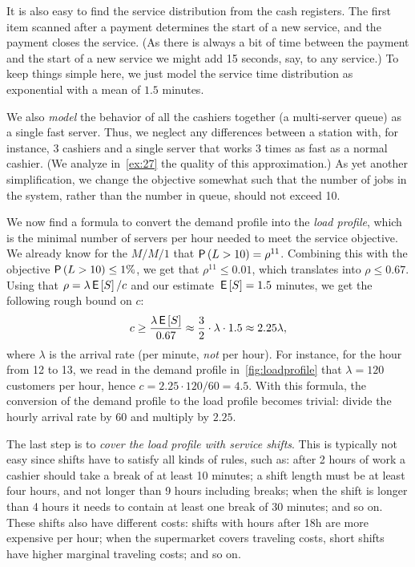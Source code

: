 It is also easy to find the service distribution from the cash registers.
The first item scanned after a payment determines the start of a new service, and the payment closes the service.
(As there is always a bit of time between the payment and the start of a new service we might add 15 seconds, say, to any service.)
To keep things simple here, we just model the service time distribution as exponential with a mean of $1.5$ minutes.

We also \emph{model} the behavior of all the cashiers together (a multi-server queue) as a single fast server.
Thus, we neglect any differences between a station with, for instance, 3 cashiers and a single server that works 3 times as fast as a normal cashier.
(We analyze in~\cref{ex:27} the quality of this approximation.)
As yet another simplification, we change the objective somewhat such that the number of jobs in the system, rather than the number in queue, should not exceed 10.

We now find a formula to convert the demand profile into the \emph{load profile}, which is the minimal number of servers per hour needed to meet the service objective. We already know for the $M/M/1$ that $\P{L>10}=\rho^{11}$.  Combining this with the objective $\P{L>10}\leq 1\%$, we get that $\rho^{11}\leq 0.01$, which  translates into $\rho \leq 0.67$. Using that $\rho = \lambda \,\mathsf{E}\left[S\right]/c$ and our estimate $\,\mathsf{E}\left[S\right]=1.5$ minutes,  we get  the following rough bound on $c$:
\begin{equation*}
c \geq \frac{\lambda \,\mathsf{E}\left[S\right]}{0.67} \approx \frac{3}2 \cdot \lambda \cdot 1.5  \approx 2.25 \lambda,
\end{equation*}
where $\lambda$ is the arrival rate (per minute, \emph{not} per hour).
For instance, for the hour from 12 to 13, we read in  the demand profile in~\cref{fig:loadprofile} that $\lambda= 120$ customers per hour, hence $c=2.25 \cdot 120/60 = 4.5$. With this formula, the conversion of the demand profile to the load profile becomes trivial: divide the hourly arrival rate by $60$ and multiply by
$2.25$.

The last step is to \emph{cover the load profile with service shifts}.
This is typically not easy since shifts have to satisfy all kinds of rules, such as: after 2 hours of work a cashier should take a break of at least 10 minutes; a shift length must be at least four hours, and not longer than 9 hours including breaks; when the shift is longer than 4 hours it needs to contain at least one break of 30 minutes; and so on.
These shifts also have different costs: shifts with hours after 18h are more expensive per hour; when the supermarket covers traveling costs, short shifts have higher marginal traveling costs; and so on.


